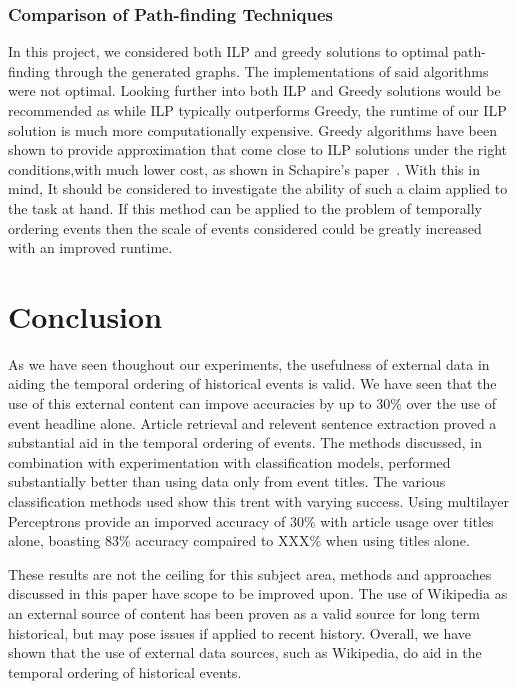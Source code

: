 \documentclass[bsc,frontabs,twoside,singlespacing,parskip,deptreport]{infthesis}     %
\begin{document}
\subsection{Comparison of Path-finding Techniques}
In this project, we considered both ILP and greedy solutions to optimal path-finding through the generated graphs.
The implementations of said algorithms were not optimal. Looking further into both ILP and Greedy solutions would
be recommended as while ILP typically outperforms Greedy, the runtime of our ILP solution is much more computationally
expensive. Greedy algorithms have been shown to provide approximation that come close to ILP solutions under the right
conditions,with much lower cost, as shown in Schapire's paper~\cite{schapire1998learning}. With this in mind,
It should be considered to investigate the ability of such a claim applied to the task at hand. If this method can
be applied to the problem of temporally ordering events then the scale of events considered could be greatly increased with
an improved runtime.



\chapter{Conclusion}
As we have seen thoughout our experiments, the usefulness of external data in aiding the temporal ordering
of historical events is valid. We have seen that the use of this external content can impove accuracies by up to
30\% over the use of event headline alone.
Article retrieval and relevent sentence extraction proved a substantial aid in the temporal ordering of events.
The methods discussed, in combination with experimentation with classification models, performed substantially better
than using data only from event titles.
The various classification methods used show this trent with varying success. Using multilayer Perceptrons provide an
imporved accuracy of 30\% with article usage over titles alone, boasting 83\% accuracy compaired to XXX\% when using titles
alone.


These results are not the ceiling for this subject area, methods and approaches discussed in this paper have scope
to be improved upon. The use of Wikipedia as an external source of content has been proven as a valid source for
long term historical, but may pose issues if applied to recent history. Overall, we have shown that the use of external
data sources, such as Wikipedia, do aid in the temporal ordering of historical events.


\end{document}
